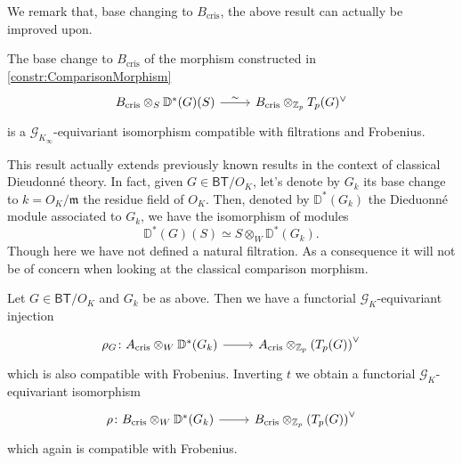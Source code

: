 \noindent
We remark that, base changing to $B_{\mathrm{cris}}$, the above result can actually be
improved upon.
\begin{thm}[]
	The base change to $B_{\mathrm{cris}}$ of the morphism
	constructed in \cref{constr:ComparisonMorphism}
	\begin{equation*}
	\begin{tikzcd}[row sep = 0ex
		,/tikz/column 1/.append style={anchor=base east}
		,/tikz/column 2/.append style={anchor=base west}]
		B_{\mathrm{cris}} \otimes_S \mathbb{D}^*(G)(S) \arrow[r, "\sim", rightarrow] &
		B_{\mathrm{cris}} \otimes_{\mathbb{Z}_{p}} T_p(G)^\vee
	\end{tikzcd}
	\end{equation*} 
	is a $\mathscr{G}_{K_\infty}$-equivariant isomorphism compatible with filtrations and Frobenius.
\end{thm}


\begin{rem}[]
	This result actually extends previously known 
	results in the context of classical Dieudonné theory.
	In fact, given $G \in \mathsf{BT}/O_K$, let's denote by $G_k$
	its base change to $k = O_K / \mathfrak{m}$ the residue field of $O_K$.
	Then, denoted by $\mathbb{D}^*(G_k)$ the Dieduonné module associated to
	$G_k$, we have the isomorphism of modules
	\begin{equation*}
		\mathbb{D}^*(G)(S) \simeq S \otimes_W \mathbb{D}^*(G_k)
	.\end{equation*}
	Though here we have not defined a natural filtration.
	As a consequence it will not be of concern when looking at the classical
	comparison morphism.
\end{rem}


\begin{thm}[]
	Let $G \in \mathsf{BT}/O_K$ and $G_k$ be as above.
	Then we have a functorial $\mathscr{G}_K$-equivariant injection
	\begin{equation*}
	\begin{tikzcd}[row sep = 0ex
		,/tikz/column 1/.append style={anchor=base east}
		,/tikz/column 2/.append style={anchor=base west}]
		\rho_G\colon 
		A_{\mathrm{cris}} \otimes_W \mathbb{D}^*(G_k)
		\arrow[r, "", rightarrow] &
		A_{\mathrm{cris}} \otimes_{\mathbb{Z}_{p}} \left( T_p(G) \right)^\vee
	\end{tikzcd}
	\end{equation*} 
	which is also compatible with Frobenius.
	Inverting $t$ we obtain a functorial $\mathscr{G}_{K}$-equivariant isomorphism
	\begin{equation*}
	\begin{tikzcd}[row sep = 0ex
		,/tikz/column 1/.append style={anchor=base east}
		,/tikz/column 2/.append style={anchor=base west}]
		\rho\colon B_{\mathrm{cris}} \otimes_W \mathbb{D}^*(G_k)
		\arrow[r, "", rightarrow] &
		B_{\mathrm{cris}} \otimes_{\mathbb{Z}_{p}} \left( T_p(G) \right)^\vee
	\end{tikzcd}
	\end{equation*} 
	which again is compatible with Frobenius.
\end{thm}


